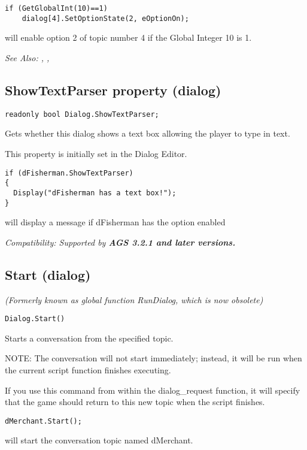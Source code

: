 \begin{verbatim}
if (GetGlobalInt(10)==1)
    dialog[4].SetOptionState(2, eOptionOn);
\end{verbatim}
will enable option 2 of topic number 4 if the Global Integer 10 is 1.

\it{See Also:} ,
, 


\subsection{ShowTextParser property (dialog)}\label{Dialog.ShowTextParser}%

\begin{verbatim}
readonly bool Dialog.ShowTextParser;
\end{verbatim}
Gets whether this dialog shows a text box allowing the player to type in text.

This property is initially set in the Dialog Editor.

\begin{verbatim}
if (dFisherman.ShowTextParser)
{
  Display("dFisherman has a text box!");
}
\end{verbatim}
will display a message if dFisherman has the option enabled

\it{Compatibility:} Supported by \bf{AGS 3.2.1} and later versions.


\subsection{Start (dialog)}\label{Dialog.Start}%

\it{(Formerly known as global function RunDialog, which is now obsolete)}

\begin{verbatim}
Dialog.Start()
\end{verbatim}
Starts a conversation from the specified topic.

NOTE: The conversation will not start immediately; instead, it will be run
when the current script function finishes executing.

If you use this command from within the dialog_request function, it will
specify that the game should return to this new topic when the script finishes.

\begin{verbatim}
dMerchant.Start();
\end{verbatim}
will start the conversation topic named dMerchant.

